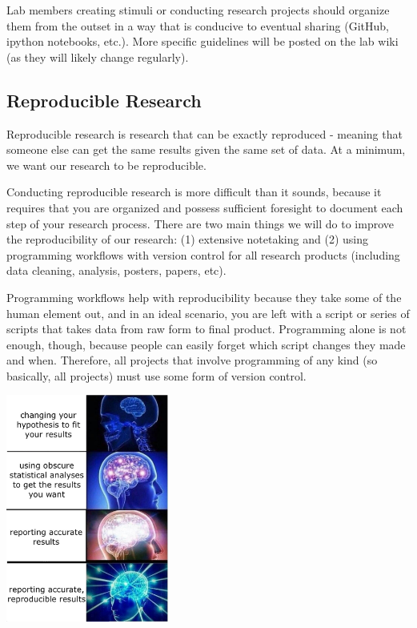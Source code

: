 \documentclass[
]{book}
\begin{document}
Lab members creating stimuli or conducting research projects should organize them from the outset in a way that is conducive to eventual sharing (GitHub, ipython notebooks, etc.). More specific guidelines will be posted on the lab wiki (as they will likely change regularly).

\hypertarget{reproducible-research}{%
\subsection{Reproducible Research}\label{reproducible-research}}

Reproducible research is research that can be exactly reproduced - meaning that someone else can get the same results given the same set of data. At a minimum, we want our research to be reproducible.

Conducting reproducible research is more difficult than it sounds, because it requires that you are organized and possess sufficient foresight to document each step of your research process. There are two main things we will do to improve the reproducibility of our research: (1) extensive notetaking and (2) using programming workflows with version control for all research products (including data cleaning, analysis, posters, papers, etc).

Programming workflows help with reproducibility because they take some of the human element out, and in an ideal scenario, you are left with a script or series of scripts that takes data from raw form to final product. Programming alone is not enough, though, because people can easily forget which script changes they made and when. Therefore, all projects that involve programming of any kind (so basically, all projects) must use some form of version control.

\includegraphics[width=0.4\textwidth,height=\textheight]{images/expanding_brain.jpeg}
\end{document}
